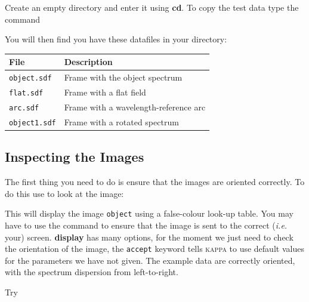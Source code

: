 \documentclass[twoside,11pt]{starlink}
\providecommand{\mlabel}[1]{\xlabel{#1}\label{#1}}
\providecommand{\scspec}[2]{#1}
\begin{document}
Create an empty directory and enter it using \textbf{cd}\@.
To copy the test data type the command

{
\scspec{\small}{ }
\begin{terminalv}
\end{terminalv}
}

You will then find you have these datafiles in your directory:

\begin{center}
\begin{tabular}{ll}
File & Description \\ \hline
\texttt{object.sdf}  & Frame with the object spectrum\\
\texttt{flat.sdf}    & Frame with a flat field\\
\texttt{arc.sdf}     & Frame with a wavelength-reference arc\\
\texttt{object1.sdf} & Frame with a rotated spectrum\\ \hline
\end{tabular}
\end{center}

\subsection{\mlabel{inspecting_the_images}Inspecting the Images}

The first thing you need to do is ensure that the images are oriented
correctly.  To do this use 
 to look at the image:

{
\scspec{\small}{ }
\begin{terminalv}
\end{terminalv}
}

This will display the image \verb+object+ using a false-colour
look-up table.  You may have to use the
\cite{xdisplay} command to ensure
that the image is sent to the correct ({\it{i.e.}} your) screen.
\textbf{display} has many
options, for the moment we just need to check the orientation of the image,
the \verb+accept+ keyword tells \textsc{kappa} to use default values for the
parameters we have not given.
The example data are correctly oriented, with the spectrum dispersion
from left-to-right.

Try

{
\scspec{\small}{ }
\begin{terminalv}
\end{terminalv}
}
\end{document}
